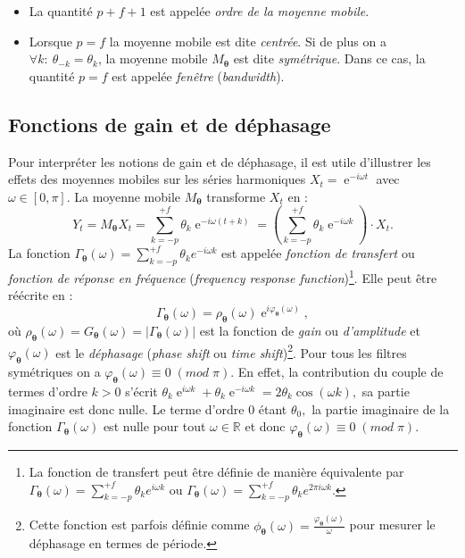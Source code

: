 \documentclass[
  12pt,
  a4paper,french]{article}
\DeclareMathOperator{\e}{e}
\newcommand\R{\mathds{R}}
\newcommand\1{\mathds{1}}
\begin{document}
\begin{itemize}
\item
  La quantité \(p+f+1\) est appelée \emph{ordre de la moyenne mobile}.
\item
  Lorsque \(p=f\) la moyenne mobile est dite \emph{centrée}.
  Si de plus on a \(\forall k:\:\theta_{-k} = \theta_k\), la moyenne mobile \(M_{\boldsymbol\theta}\) est dite \emph{symétrique}.
  Dans ce cas, la quantité \(p=f\) est appelée \emph{fenêtre} (\emph{bandwidth}).
\end{itemize}

\hypertarget{subsec:gain-deph}{%
\subsection{Fonctions de gain et de déphasage}\label{subsec:gain-deph}}

Pour interpréter les notions de gain et de déphasage, il est utile d'illustrer les effets des moyennes mobiles sur les séries harmoniques \(X_t=\e^{-i\omega t}\) avec \(\omega\in[0,\pi]\).
La moyenne mobile \(M_{\boldsymbol\theta}\) transforme \(X_t\) en :
\[
Y_t = M_{\boldsymbol\theta}X_t = \sum_{k=-p}^{+f} \theta_k \e^{-i \omega (t+k)}
= \left(\sum_{k=-p}^{+f} \theta_k \e^{-i \omega k}\right)\cdot X_t.
\]
La fonction \(\Gamma_{\boldsymbol\theta}(\omega)=\sum_{k=-p}^{+f} \theta_k e^{-i \omega k}\) est appelée \emph{fonction de transfert} ou \emph{fonction de réponse en fréquence} (\emph{frequency response function})\footnote{
  La fonction de transfert peut être définie de manière équivalente par \(\Gamma_{\boldsymbol\theta}(\omega)=\sum_{k=-p}^{+f} \theta_k e^{i \omega k}\) ou \(\Gamma_{\boldsymbol\theta}(\omega)=\sum_{k=-p}^{+f} \theta_k e^{2\pi i \omega k}\).}.
Elle peut être réécrite en :
\[
\Gamma_{\boldsymbol\theta}(\omega) = \rho_{\boldsymbol\theta}(\omega)\e^{i\varphi_{\boldsymbol\theta}(\omega)},
\]
où \(\rho_{\boldsymbol\theta}(\omega)=G_{\boldsymbol\theta}(\omega)=\lvert\Gamma_{\boldsymbol\theta}(\omega)\rvert\) est la fonction de \emph{gain} ou \emph{d'amplitude} et \(\varphi_{\boldsymbol\theta}(\omega)\) est le \emph{déphasage} (\emph{phase shift} ou \emph{time shift})\footnote{
  Cette fonction est parfois définie comme \(\phi_{\boldsymbol\theta}(\omega)=\frac{\varphi_{\boldsymbol\theta}(\omega)}{\omega}\) pour mesurer le déphasage en termes de période.}.
Pour tous les filtres symétriques on a \(\varphi_{\boldsymbol\theta}(\omega)\equiv 0 \;(mod\;{\pi})\).
En effet, la contribution du couple de termes d'ordre \(k>0\) s'écrit \(\theta_k\e^{i\omega k}+\theta_k\e^{-i\omega k} = 2\theta_k\cos (\omega k),\) sa partie imaginaire est donc nulle.
Le terme d'ordre \(0\) étant \(\theta_0,\) la partie imaginaire de la fonction \(\Gamma_{\boldsymbol\theta}(\omega)\) est nulle pour tout \(\omega\in\R\) et donc \(\varphi_{\boldsymbol\theta}(\omega)\equiv 0 \;(mod\;{\pi}).\)
\end{document}
